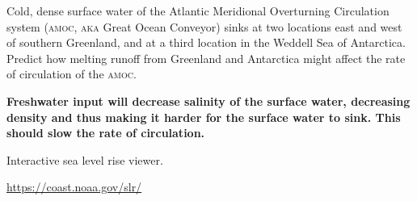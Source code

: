 \documentclass[12pt, addpoints]{exam}
\begin{document}
\begin{questions}
\question[5]
Cold, dense surface water of the Atlantic Meridional Overturning 
Circulation system (\textsc{amoc, aka} Great Ocean Conveyor) sinks at 
two locations east and west of southern Greenland, and at a third 
location in the Weddell Sea of Antarctica. Predict how melting runoff 
from Greenland and Antarctica might affect the rate of circulation of 
the \textsc{amoc.}
 
\ifprintanswers\textbf{%
Freshwater input will decrease salinity of the surface water, decreasing
density and thus making it harder for the surface water to sink. This
should slow the rate of circulation.
}\fi

\ifprintanswers
Interactive sea level rise viewer.

\url{https://coast.noaa.gov/slr/}
\fi
\end{questions}
\end{document}
